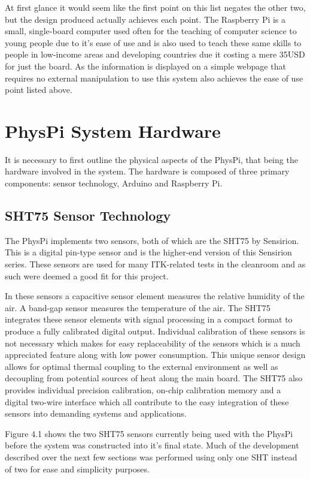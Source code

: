 \documentclass[letterpaper, 11pt]{report}
\begin{document}
At first glance it would seem like the first point on this list negates the other two, but the design produced actually achieves each point.  The Raspberry Pi is a small, single-board computer used often for the teaching of computer science to young people due to it's ease of use and is also used to teach these same skills to people in low-income areas and developing countries due it costing a mere 35USD for just the board.  As the information is displayed on a simple webpage that requires no external manipulation to use this system also achieves the ease of use point listed above.


\section{PhysPi System Hardware}

It is necessary to first outline the physical aspects of the PhysPi, that being the hardware involved in the system.  The hardware is composed of three primary components: sensor technology, Arduino and Raspberry Pi.

\subsection{SHT75 Sensor Technology}

The PhysPi implements two sensors, both of which are the SHT75 by Sensirion.  This is a digital pin-type sensor and is the higher-end version of this Sensirion series.  These sensors are used for many ITK-related tests in the cleanroom and as such were deemed a good fit for this project.

In these sensors a capacitive sensor element measures the relative humidity of the air.  A band-gap sensor measures the temperature of the air.  The SHT75 integrates these sensor elements with signal processing in a compact format to produce a fully calibrated digital output.  Individual calibration of these sensors is not necessary which makes for easy replaceability of the sensors which is a much appreciated feature along with low power consumption.  This unique sensor design allows for optimal thermal coupling to the external environment as well as decoupling from potential sources of heat along the main board.  The SHT75 also provides individual precision calibration, on-chip calibration memory and a digital two-wire interface which all contribute to the easy integration of these sensors into demanding systems and applications.

Figure 4.1 shows the two SHT75 sensors currently being used with the PhysPi before the system was constructed into it's final state.  Much of the development described over the next few sections was performed using only one SHT instead of two for ease and simplicity purposes.
\end{document}
